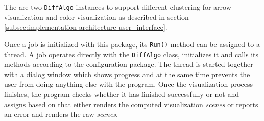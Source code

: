 The are two \verb+DiffAlgo+ instances to support different clustering for arrow visualization and color visualization as described in section \ref{subsec:implementation-architecture-user_interface}.

Once a job is initialized with this package, its \verb+Run()+ method can be assigned to a thread. A job operates directly with the \verb+DiffAlgo+ class, initializes it and calls its methods according to the configuration package. The thread is started together with a dialog window which shows progress and at the same time prevents the user from doing anything else with the program. Once the visualization process finishes, the program checks whether it has finished successfully or not and assigns based on that either renders the computed visualization {\it scenes} or reports an error and renders the raw {\it scenes}.